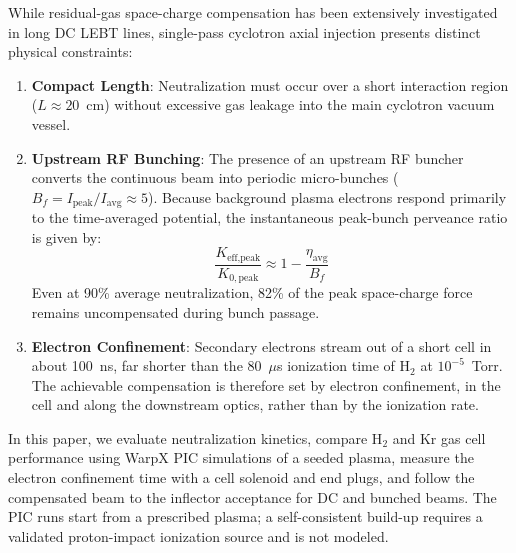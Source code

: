 \documentclass[banner]{jacow}
\begin{document}
While residual-gas space-charge compensation has been extensively investigated in long DC LEBT lines, single-pass cyclotron axial injection presents distinct physical constraints:
\begin{enumerate}
    \item \textbf{Compact Length}: Neutralization must occur over a short interaction region ($L \approx 20$~cm) without excessive gas leakage into the main cyclotron vacuum vessel.
    \item \textbf{Upstream RF Bunching}: The presence of an upstream RF buncher converts the continuous beam into periodic micro-bunches ($B_f = I_{\text{peak}} / I_{\text{avg}} \approx 5$). Because background plasma electrons respond primarily to the time-averaged potential, the instantaneous peak-bunch perveance ratio is given by:
    \begin{equation}
    \frac{K_{\text{eff,peak}}}{K_{0,\text{peak}}} \approx 1 - \frac{\eta_{\text{avg}}}{B_f}
    \end{equation}
    Even at 90\% average neutralization, 82\% of the peak space-charge force remains uncompensated during bunch passage.
    \item \textbf{Electron Confinement}: Secondary electrons stream out of a short cell in about 100~ns, far shorter than the 80~$\mu$s ionization time of H$_2$ at $10^{-5}$~Torr. The achievable compensation is therefore set by electron confinement, in the cell and along the downstream optics, rather than by the ionization rate.
\end{enumerate}

In this paper, we evaluate neutralization kinetics, compare H$_2$ and Kr gas cell performance using WarpX PIC simulations of a seeded plasma, measure the electron confinement time with a cell solenoid and end plugs, and follow the compensated beam to the inflector acceptance for DC and bunched beams. The PIC runs start from a prescribed plasma; a self-consistent build-up requires a validated proton-impact ionization source and is not modeled.
\end{document}
